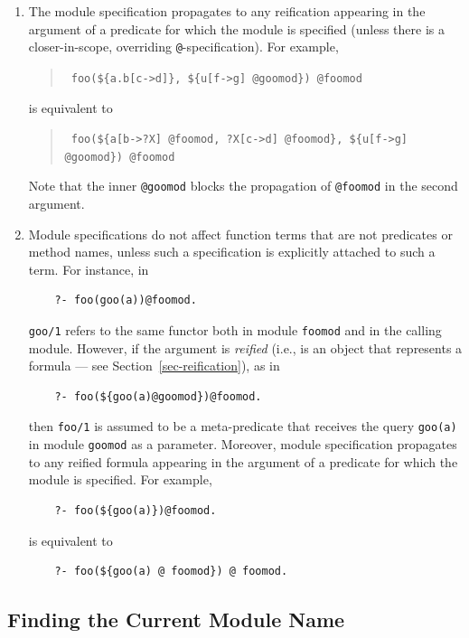 \documentclass[11pt]{article}
\begin{document}
\begin{enumerate}
\item The module specification propagates to any reification appearing
  in the argument of a predicate for which the module is
  specified (unless there is a closer-in-scope, overriding
  \texttt{@}-specification). For example,
  \begin{quote}
    {\tt
    foo(\$\{a.b[c->d]\}, \$\{u[f->g] @goomod\}) @foomod
    }
  \end{quote}
  is equivalent to
  \begin{quote}
    {\tt
    foo(\$\{a[b->?X] @foomod, ?X[c->d] @foomod\}, \$\{u[f->g] @goomod\}) @foomod
    }
  \end{quote}
  Note that the inner \texttt{@goomod} blocks the propagation of
  \texttt{@foomod} in the second argument.  
  
\item Module specifications do not affect function terms that are not
  predicates or method names, unless such a specification is explicitly
  attached to such a term. For instance, in
  \begin{verbatim}
    ?- foo(goo(a))@foomod.
  \end{verbatim}
  {\tt goo/1} refers to the same functor both in module {\tt foomod} and in
  the calling module. However, if the argument is \emph{reified} (i.e., is
  an object that represents a formula --- see
  Section~\ref{sec-reification}), as in
  \begin{verbatim}
    ?- foo(${goo(a)@goomod})@foomod.
  \end{verbatim}
  then {\tt foo/1} is assumed to be a meta-predicate that receives the
  query {\tt goo(a)} in module {\tt goomod} as a parameter. Moreover,
  module specification propagates to any reified formula appearing in
  the argument of a predicate for which the module is specified. For example,
  \begin{verbatim}
    ?- foo(${goo(a)})@foomod.
  \end{verbatim}
is equivalent to
  \begin{verbatim}
    ?- foo(${goo(a) @ foomod}) @ foomod.
  \end{verbatim}

\end{enumerate}


\subsection{Finding the Current Module Name}\label{sec-currmod}
\end{document}
